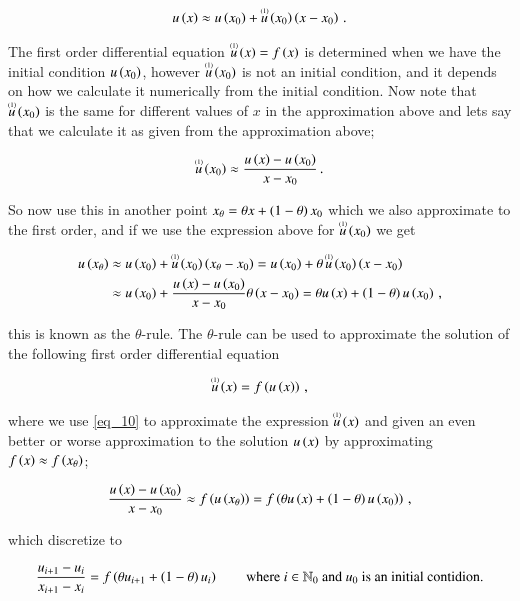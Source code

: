 \documentclass[11pt,english,a4paper]{article}
\begin{document}
\begin{flushleft}
\begin{align*}
u\p{x} \approx u\p{x_0} + \T{u}{(1)}\p{x_0}\p{x-x_0} \,.
\end{align*}

The first order differential equation $\T{u}{(1)}\p{x} = f\p{x}$ is determined when we have the initial condition $u\p{x_0}$, however $\T{u}{(1)}\p{x_0}$ is not an initial condition, and it depends on how we calculate it numerically from the initial condition. Now note that $\T{u}{(1)}\p{x_0}$ is the same for different values of $x$ in the approximation above and lets say that we calculate it as given from the approximation above;

\begin{align}
\T{u}{(1)}\p{x_0} \approx \frac{u\p{x}-u\p{x_0}}{x-x_0}\,.
\label{eq_10}
\end{align}

So now use this in another point $x_{\theta} = \theta x + \p{1-\theta}x_0$ which we also approximate to the first order, and if we use the expression above for $\T{u}{(1)}\p{x_0}$ we get

\begin{align}
u\p{x_\theta} &\approx u\p{x_0} + \T{u}{(1)}\p{x_0}\p{x_{\theta}-x_0} = u\p{x_0} + \theta\,\T{u}{(1)}\p{x_0}\p{x-x_0} 
\nonumber\\
&\approx u\p{x_0} + \frac{u\p{x}-u\p{x_0}}{x-x_0}\theta\p{x-x_0} = \theta u\p{x} + \p{1-\theta}u\p{x_0} \,,
\label{eq_11}
\end{align}

this is known as the $\theta$-rule. The $\theta$-rule can be used to approximate the solution of the following first order differential equation

\begin{align}
\T{u}{(1)}\p{x} = f\p{u\p{x}} \,,
\label{eq_12}
\end{align}

where we use \eqref{eq_10} to approximate the expression $\T{u}{(1)}\p{x}$ and given an even better or worse approximation to the solution $u\p{x}$ by approximating $f\p{x}\approx f\p{x_{\theta}}$;

\begin{align*}
\frac{u\p{x}-u\p{x_0}}{x-x_0} \approx f\p{u\p{x_{\theta}}} = f\p{\theta u\p{x} + \p{1-\theta}u\p{x_0}}\,,
\end{align*}

which discretize to

\begin{align}
\frac{u_{i+1}-u_i}{x_{i+1}-x_i} = f\p{\theta u_{i+1} + \p{1-\theta}u_i} \qquad \text{where } i\in\mathbb{N}_0 \text{ and $u_0$ is an initial contidion.} 
\label{eq_13}
\end{align}


\end{flushleft}
\end{document}
